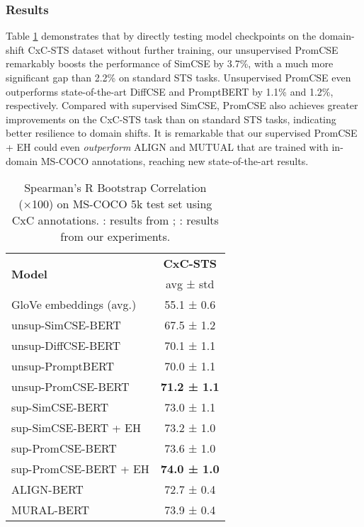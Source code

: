 \documentclass[11pt]{article}
\begin{document}
\subsubsection{Results}
Table \ref{tab: transfer sts} demonstrates that by directly testing model checkpoints on the domain-shift CxC-STS dataset without further training, our unsupervised PromCSE remarkably boosts the performance of SimCSE by 3.7\%, with a much more significant gap than 2.2\% on standard STS tasks. Unsupervised PromCSE even outperforms state-of-the-art DiffCSE and PromptBERT by 1.1\% and 1.2\%, respectively.
Compared with supervised SimCSE, PromCSE also achieves greater improvements on the CxC-STS task than on standard STS tasks, indicating better resilience to domain shifts.
It is remarkable that our supervised PromCSE + EH could even \emph{outperform} ALIGN and MUTUAL that are trained with in-domain MS-COCO annotations, reaching new state-of-the-art results.


\begin{table}[t]
\small
\centering
\begin{tabular}{lc}
\toprule
\multirow{2}{*}{\textbf{Model}}             & \textbf{CxC-STS}    \\
                                   & avg ± std  \\
\midrule
GloVe embeddings (avg.)            & 55.1 ± 0.6   \\
 unsup-SimCSE-BERT              & 67.5 ± 1.2 \\
 unsup-DiffCSE-BERT             & 70.1 ± 1.1 \\
 unsup-PromptBERT               & 70.0 ± 1.1 \\
 unsup-PromCSE-BERT            & \textbf{71.2 ± 1.1} \\
\midrule
 sup-SimCSE-BERT                & 73.0 ± 1.1 \\
 sup-SimCSE-BERT + EH  & 73.2 ± 1.0 \\
 sup-PromCSE-BERT               & 73.6 ± 1.0 \\
 sup-PromCSE-BERT + EH & \textbf{74.0 ± 1.0} \\
\midrule
ALIGN-BERT                         & 72.7 ± 0.4 \\
MURAL-BERT                         & 73.9 ± 0.4 \\
\bottomrule
\end{tabular}
\caption{\label{tab: transfer sts}
Spearman’s R Bootstrap Correlation (×100) on MS-COCO 5k test set using CxC annotations. : results from \cite{jain-etal-2021-mural-multimodal};  : results from our experiments.
}
\end{table}
\end{document}
